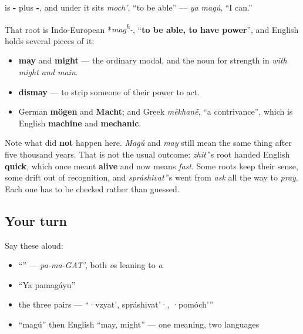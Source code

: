 \begin{cousinweb}
\textbf{} is \textbf{-} plus \textbf{-}, and under it sits \emph{moch'}, \textquotedblleft{}to be able\textquotedblright{} — \emph{ya magú}, \textquotedblleft{}I can.\textquotedblright{}

That root is Indo-European *\emph{mag\textsuperscript{h}-}, \textquotedblleft{}\textbf{to be able, to have power}\textquotedblright{}, and English holds several pieces of it:

\begin{itemize}
\raggedright
  \item \textbf{may} and \textbf{might} — the ordinary modal, and the noun for strength in \emph{with might and main}.
  \item \textbf{dismay} — to strip someone of their power to act.
  \item German \textbf{mögen} and \textbf{Macht}; and Greek \emph{mēkhan\'{\={e}}}, \textquotedblleft{}a contrivance\textquotedblright{}, which is English \textbf{machine} and \textbf{mechanic}.
\end{itemize}

Note what did \textbf{not} happen here. \emph{Magú} and \emph{may} still mean the same thing after five thousand years. That is not the usual outcome: \emph{zhit'}'s root handed English \textbf{quick}, which once meant \textbf{alive} and now means \emph{fast}. Some roots keep their sense, some drift out of recognition, and \emph{spráshivat'}'s went from \emph{ask} all the way to \emph{pray}. Each one has to be checked rather than guessed.
\end{cousinweb}

\subsection*{Your turn}
Say these aloud:

\begin{itemize}
\raggedright
  \item \textquotedblleft{}\textquotedblright{} — \emph{pa-ma-GAT'}, both \emph{o}s leaning to \emph{a}
  \item \textquotedblleft{}Ya pamagáyu\textquotedblright{}
  \item the three pairs — \textquotedblleft{}·vzyat', spráshivat'·, ·pomóch'\textquotedblright{}
  \item \textquotedblleft{}magú\textquotedblright{} then English \textquotedblleft{}may, might\textquotedblright{} — one meaning, two languages
\end{itemize}

